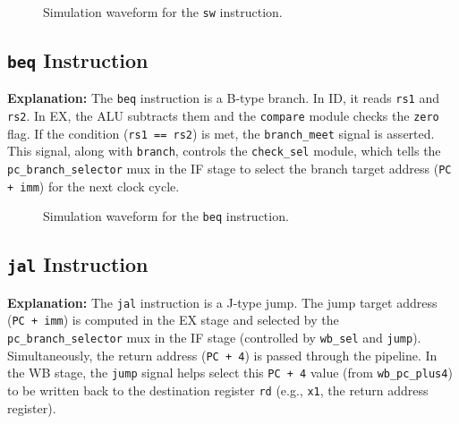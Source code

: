 \documentclass{article}
\begin{document}
\begin{figure}[H]
    \centering
    \caption{Simulation waveform for the \texttt{sw} instruction.}
    \label{fig:sw_sim}
\end{figure}

\subsection{\texttt{beq} Instruction}
\textbf{Explanation:} The \texttt{beq} instruction is a B-type branch. In ID, it reads \texttt{rs1} and \texttt{rs2}. In EX, the ALU subtracts them and the \texttt{compare} module checks the \texttt{zero} flag. If the condition (\texttt{rs1 == rs2}) is met, the \texttt{branch\_meet} signal is asserted. This signal, along with \texttt{branch}, controls the \texttt{check\_sel} module, which tells the \texttt{pc\_branch\_selector} mux in the IF stage to select the branch target address (\texttt{PC + imm}) for the next clock cycle.

\begin{figure}[H]
    \centering
    \caption{Simulation waveform for the \texttt{beq} instruction.}
    \label{fig:beq_sim}
\end{figure}

\subsection{\texttt{jal} Instruction}
\textbf{Explanation:} The \texttt{jal} instruction is a J-type jump. The jump target address (\texttt{PC + imm}) is computed in the EX stage and selected by the \texttt{pc\_branch\_selector} mux in the IF stage (controlled by \texttt{wb\_sel} and \texttt{jump}). Simultaneously, the return address (\texttt{PC + 4}) is passed through the pipeline. In the WB stage, the \texttt{jump} signal helps select this \texttt{PC + 4} value (from \texttt{wb\_pc\_plus4}) to be written back to the destination register \texttt{rd} (e.g., \texttt{x1}, the return address register).
\end{document}
